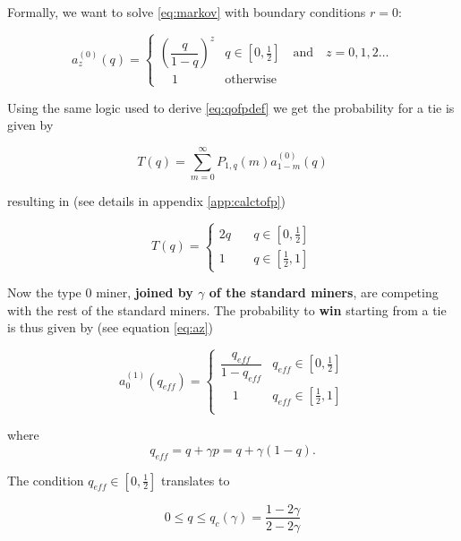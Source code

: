 \documentclass[letterpaper,12pt]{report}
\theoremstyle{plain}
\theoremstyle{definition}
\begin{document}
Formally, we want to solve \ref{eq:markov} with boundary conditions $r=0$:

\begin{equation}\label{eq:bz}
\mathit{a}_z^{(0)}(q)=\begin{cases}\left( \dfrac{q}{1-q}\right)^z & q\in [0,\frac{1}{2}] \quad \mathrm{and} \quad z=0,1,2\dots \\ \quad 1 & \mathrm{otherwise} \end{cases}
\end{equation}

Using the same logic used to derive \ref{eq:qofpdef} we get the probability for a tie is given by

\begin{equation}\label{eq:qofpdef}
\mathit{T}(q)= \sum_{m=0}^{\infty}\mathit{P}_{1,q}(m)\mathit{a}^{(0)}_{1-m}(q)
\end{equation}

resulting in (see details in appendix \ref{app:calctofp})

\begin{equation}\label{eq:qofp}
\mathit{T}(q)=
\begin{cases}
2q & \quad q \in [0,\frac{1}{2}] \\
1 & \quad q \in [\frac{1}{2},1] 
\end{cases}
\end{equation}

Now the type 0 miner, \textbf{joined by $\gamma$ of the standard miners}, are competing with the rest of the standard miners. The probability to \textbf{win} starting from a tie is thus given by (see equation \ref{eq:az}) 

\begin{equation}\label{eq:azeroeff}
\mathit{a}^{(1)}_0(q_{eff})=\begin{cases} \dfrac{q_{eff}}{1-q_{eff}} & q_{eff}\in [0,\frac{1}{2}] \\  
\quad 1 & q_{eff}\in [\frac{1}{2},1] \\ \end{cases}
\end{equation}

where 
\begin{equation}\label{qeff}
q_{eff}=q+\gamma p=q+\gamma(1-q).
\end{equation}

The condition $q_{eff}\in [0,\frac{1}{2}]$ translates to 

\begin{equation}\label{qcrit}
0\leq q\leq q_{c}(\gamma)=\dfrac{1-2\gamma}{2-2\gamma}
\end{equation}
\end{document}
